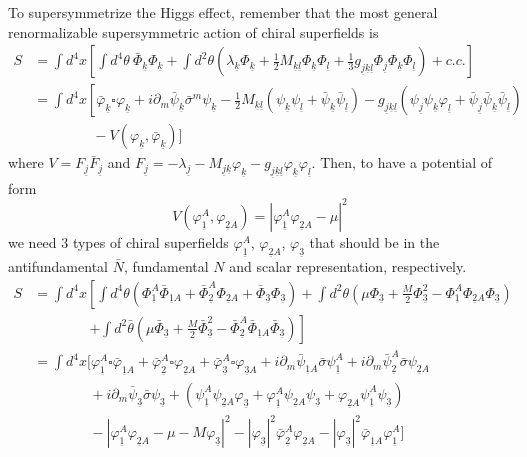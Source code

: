 \documentclass[a4paper,12pt]{article}
\numberwithin{equation}{section}
\numberwithin{exe}{section}
\newcommand{\p}{{\partial}}
\newcommand{\Fb}{{\bar F}}
\newcommand{\ju}{{\underline j}}
\newcommand{\ku}{{\underline k}}
\newcommand{\lu}{{\underline l}}
\renewcommand{\l}{{\lambda}}
\newcommand{\m}{{\mu}}
\renewcommand{\sb}{{\bar\sigma}}
\renewcommand{\t}{{\theta}}
\newcommand{\tb}{{\bar\theta}}
\newcommand{\vphi}{{\varphi}}
\newcommand{\vphib}{{\bar\varphi}}
\newcommand{\Phib}{{\bar \Phi}}
\newcommand{\psib}{{\bar\psi}}
\begin{document}
To supersymmetrize the Higgs effect, remember that the most general renormalizable supersymmetric action of chiral superfields is
	\begin{align}
	S & = \int d^4x \left[ \int d^4\t\ \Phib_\ku\Phi_\ku + \int d^2\t(\l_\ku\Phi_\ku + \frac12 M_{\ku\lu}\Phi_\ku\Phi_\lu + \frac13 g_{\ju\ku\lu}\Phi_\ju\Phi_\ku\Phi_\lu) + c.c. \right] \nonumber \\
	& = \int d^4x\left[\vphib_\ku\square \vphi_\ku + i\p_m\psib_\ku\sb^m\psi_\ku - \frac12 M_{\ku\lu}(\psi_\ku\psi_\lu + \psib_\ku\psib_\lu) - g_{\ju\ku\lu}(\psi_\ju\psi_\ku\vphi_\lu + \psib_\ju\psib_\ku\psib_\lu) \right. \nonumber \\
	& \qquad\qquad\ - V(\vphi_\ku, \vphib_\ku) \Big]
	\end{align}
where $V=F_\ju \Fb_\ju$ and $F_\ju = -\l_\ju - M_{\ju\ku}\vphi_\ku - g_{\ju\ku\lu}\vphi_\ku\vphi_\lu$. Then, to have a potential of form
	\begin{equation}
	V(\vphi_{\underline 1}^A, \vphi_{\underline 2 A}) = \left|\vphi_{\underline 1}^A \vphi_{\underline 2 A} - \m\right|^2
	\end{equation}
we need 3 types of chiral superfields $\vphi_{\underline 1}^A$, $\vphi_{\underline 2 A}$, $\vphi_{\underline 3}$ that should be in the antifundamental $\bar N$, fundamental $N$ and scalar representation, respectively.
	\begin{align}
	S & = \int d^4x \left[ \int d^4\t (\Phi^A_{\underline 1}\Phib_{\underline 1 A} + \Phib^A_{\underline 2}\Phi_{\underline 2 A} + \Phib_{\underline 3}\Phi_{\underline 3}) + \int d^2\t(\m\Phi_{\underline 3} + \frac{M}{2}\Phi^2_{\underline 3} - \Phi^A_{\underline 1}\Phi_{\underline 2 A}\Phi_{\underline 3})\right. \nonumber \\
	& \qquad\qquad \left. + \int d^2\tb(\m\Phib_{\underline 3} + \frac{M}{2}\Phib^2_{\underline 3} - \Phib^A_{\underline 2}\Phib_{\underline 1 A}\Phib_{\underline 3}) \right] \label{shiggs} \\
	& = \int d^4x\Big[ \vphi^A_{\underline 1}\square \vphib_{\underline 1 A} + \vphib^A_{\underline 2}\square \vphi_{\underline 2 A} + \vphib^A_{\underline 3}\square \vphi_{\underline 3 A}  + i\p_m\psib_{\underline 1 A}\sb\psi^A_{\underline 1} + i\p_m\psib^A_{\underline 2}\sb\psi_{\underline 2 A} \nonumber \\
	& \qquad\qquad + i\p_m\psib_{\underline 3}\sb\psi_{\underline 3} + (\psi^A_{\underline 1}\psi_{\underline 2 A}\vphi_{\underline 3} + \vphi^A_{\underline 1}\psi_{\underline 2 A}\psi_{\underline 3} + \vphi_{\underline 2 A}\psi^A_{\underline 1}\psi_{\underline 3}) \nonumber \\
	& \qquad\qquad - \left|\vphi^A_{\underline 1}\vphi_{\underline 2 A} - \m-M\vphi_{\underline 3}\right|^2 - |\vphi_{\underline 3}|^2\vphib^A_{\underline 2}\vphi_{\underline 2 A} - |\vphi_{\underline 3}|^2\vphib_{\underline 1 A} \vphi^A_{\underline 1} \Big]
	\end{align}
\end{document}
